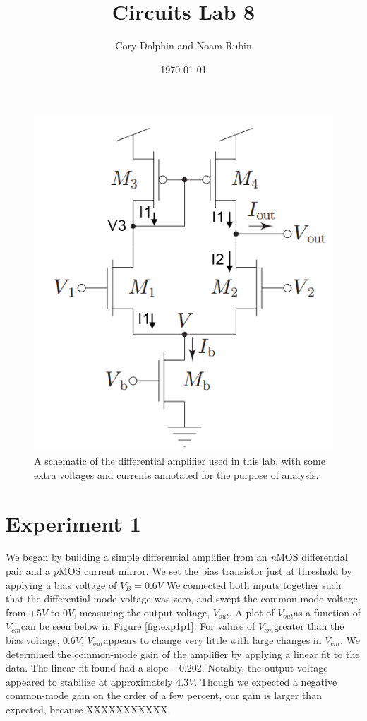 \documentclass{article}
\title{Circuits Lab 8}
\author{Cory Dolphin and Noam Rubin}
\date{\today}
\newcommand{\Vout}{{$V_{out}$}}
\newcommand{\Vcm}{{$V_{cm}$}}
\newcommand{\nMOS}{{\textit{n}MOS }}
\newcommand{\pMOS}{{\textit{p}MOS }}
\begin{document}
\maketitle

\begin{figure}[H]
\centering
\includegraphics[width=0.6\linewidth]{../Figures/Lab8Schematic}
\caption{A schematic of the differential amplifier used in this lab, with some extra voltages and currents annotated for the purpose of analysis.}
\label{fig:lab8schem}
\end{figure}


\section*{Experiment 1}
We began by building a simple differential amplifier from an \nMOS differential pair and a \pMOS current mirror. We set the bias transistor just at threshold by applying a bias voltage of $V_B=0.6V$ We connected both inputs together such that the differential mode voltage was zero, and swept the common mode voltage from $+5V$ to $0V$, measuring the output voltage, \Vout. 
A plot of \Vout as a function of \Vcm can be seen below in Figure \ref{fig:exp1p1}. For values of \Vcm greater than the bias voltage, $0.6V$, \Vout appears to change very little with large changes in \Vcm.  We determined the common-mode gain of the amplifier by applying a linear fit to the data. The linear fit found had a slope $-0.202$. Notably, the output voltage appeared to stabilize at approximately $4.3V$.
Though we expected a negative common-mode gain on the order of a few percent, our gain is larger than expected, because XXXXXXXXXXX.
\end{document}
